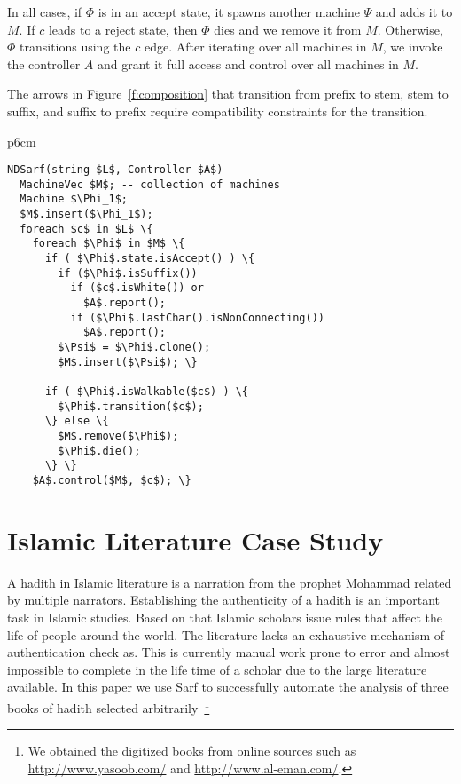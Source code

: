 \documentclass[11pt,letterpaper]{article}
\begin{document}
In all cases, if $\Phi$ is in an accept state, 
it spawns another machine $\Psi$ and adds it to $M$. 
If $c$ leads to a reject state, then $\Phi$ dies 
and we remove it from $M$. 
Otherwise, $\Phi$ transitions using the $c$ edge.
After iterating over all machines in $M$, we invoke the 
controller $A$
and grant it full access and control over
all machines in $M$. 

The arrows in Figure~\ref{f:composition} that transition
from prefix to stem, stem to suffix, and suffix to prefix
require compatibility constraints for 
the transition.

\begin{table}[tb]
\centering
\begin{tabular} {p{6cm}}
\begin{Verbatim}[fontsize=\relsize{-1},
frame=topline,framesep=4mm,label=\fbox{NDSarf algorithm},
commandchars=\\\{\}, codes={\catcode`$=3\catcode`_=8}]
NDSarf(string $L$, Controller $A$) 
  MachineVec $M$; -- collection of machines
  Machine $\Phi_1$;
  $M$.insert($\Phi_1$);
  foreach $c$ in $L$ \{
    foreach $\Phi$ in $M$ \{
      if ( $\Phi$.state.isAccept() ) \{
        if ($\Phi$.isSuffix())
          if ($c$.isWhite()) or 
            $A$.report();
          if ($\Phi$.lastChar().isNonConnecting())
            $A$.report();
        $\Psi$ = $\Phi$.clone();
        $M$.insert($\Psi$); \}

      if ( $\Phi$.isWalkable($c$) ) \{
        $\Phi$.transition($c$);
      \} else \{
        $M$.remove($\Phi$);
        $\Phi$.die();
      \} \} 
    $A$.control($M$, $c$); \}
\end{Verbatim}
\end{tabular}
\label{a:ndsarf}
\end{table}

\section{Islamic Literature Case Study}
\label{sec:islamic}

A hadith in Islamic literature is a narration from the prophet Mohammad
related by multiple narrators.
Establishing the authenticity of a hadith is an important task
in Islamic studies. 
Based on that Islamic scholars issue rules that affect the life
of people around the world. 
The literature lacks an exhaustive mechanism of authentication
check as. This is currently manual work prone to error and almost
impossible to complete in the life time of a scholar due to the
large literature available. 
In this paper we use Sarf to successfully automate the
analysis of three books of hadith selected 
arbitrarily~\cite{IbnHanbal,AlKulayni,AlTousi}\footnote{We obtained
  the digitized books from online sources such as 
  \href{http://www.yasoob.com/}{http://www.yasoob.com/} and 
  \href{http://www.al-eman.com/}{http://www.al-eman.com/}. }
\end{document}
